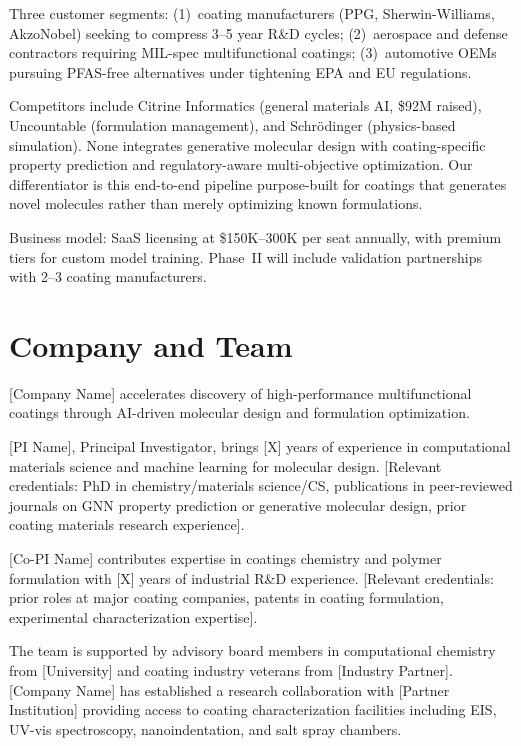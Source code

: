 \documentclass[11pt,letterpaper]{article}
\begin{document}
Three customer segments: (1)~coating manufacturers (PPG, Sherwin-Williams, AkzoNobel) seeking to compress 3--5 year R\&D cycles; (2)~aerospace and defense contractors requiring MIL-spec multifunctional coatings; (3)~automotive OEMs pursuing PFAS-free alternatives under tightening EPA and EU regulations.

Competitors include Citrine Informatics (general materials AI, \$92M raised), Uncountable (formulation management), and Schr\"odinger (physics-based simulation). None integrates generative molecular design with coating-specific property prediction and regulatory-aware multi-objective optimization. Our differentiator is this end-to-end pipeline purpose-built for coatings that generates novel molecules rather than merely optimizing known formulations.

Business model: SaaS licensing at \$150K--300K per seat annually, with premium tiers for custom model training. Phase~II will include validation partnerships with 2--3 coating manufacturers.


\section{Company and Team}

[Company Name] accelerates discovery of high-performance multifunctional coatings through AI-driven molecular design and formulation optimization.

[PI Name], Principal Investigator, brings [X] years of experience in computational materials science and machine learning for molecular design. [Relevant credentials: PhD in chemistry/materials science/CS, publications in peer-reviewed journals on GNN property prediction or generative molecular design, prior coating materials research experience].

[Co-PI Name] contributes expertise in coatings chemistry and polymer formulation with [X] years of industrial R\&D experience. [Relevant credentials: prior roles at major coating companies, patents in coating formulation, experimental characterization expertise].

The team is supported by advisory board members in computational chemistry from [University] and coating industry veterans from [Industry Partner]. [Company Name] has established a research collaboration with [Partner Institution] providing access to coating characterization facilities including EIS, UV-vis spectroscopy, nanoindentation, and salt spray chambers.
\end{document}
